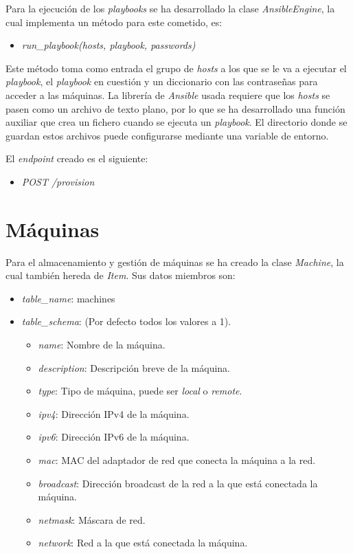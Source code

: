 \bigskip
Para la ejecución de los \textit{playbooks} se ha desarrollado la clase \textit{AnsibleEngine}, la cual implementa un método para este cometido, es:
\begin{itemize}
	\item \textit{run\_playbook(hosts, playbook, passwords)}
\end{itemize}

\bigskip
Este método toma como entrada el grupo de \textit{hosts} a los que se le va a ejecutar el \textit{playbook}, el \textit{playbook} en cuestión y un diccionario con las contraseñas para acceder a las máquinas. La librería de \textit{Ansible} usada requiere que los \textit{hosts} se pasen como un archivo de texto plano, por lo que se ha desarrollado una función auxiliar que crea un fichero cuando se ejecuta un \textit{playbook}. El directorio donde se guardan estos archivos puede configurarse mediante una variable de entorno.



\bigskip
El \textit{endpoint} creado es el siguiente:
\begin{itemize}
	\item \textit{POST /provision}
\end{itemize}




\section{Máquinas}

Para el almacenamiento y gestión de máquinas se ha creado la clase \textit{Machine}, la cual también hereda de \textit{Item}. Sus datos miembros son:
\begin{itemize}
	\item \textit{table\_name}: machines
	\item \textit{table\_schema}: (Por defecto todos los valores a 1).
	\begin{itemize}
		\item \textit{name}: Nombre de la máquina.
		\item \textit{description}: Descripción breve de la máquina.
		\item \textit{type}: Tipo de máquina, puede ser \textit{local} o \textit{remote}.
		\item \textit{ipv4}: Dirección IPv4 de la máquina.
		\item \textit{ipv6}: Dirección IPv6 de la máquina.
		\item \textit{mac}: MAC del adaptador de red que conecta la máquina a la red.
		\item \textit{broadcast}: Dirección broadcast de la red a la que está conectada la máquina.
		\item \textit{netmask}: Máscara de red.
		\item \textit{network}: Red a la que está conectada la máquina.
	\end{itemize}
\end{itemize}


